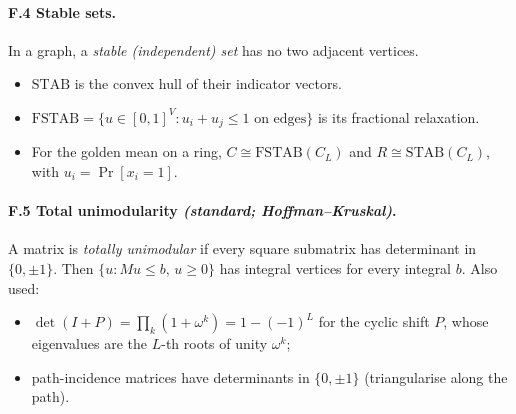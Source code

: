 \documentclass[11pt]{article}
\theoremstyle{definition}
\theoremstyle{remark}
\begin{document}
\paragraph{F.4 Stable sets.} In a graph, a \emph{stable (independent) set} has no
two adjacent vertices.
\begin{itemize}[nosep]
\item $\mathrm{STAB}$ is the convex hull of their indicator vectors.
\item $\mathrm{FSTAB}=\{u\in[0,1]^V: u_i+u_j\le1 \text{ on edges}\}$ is its
  fractional relaxation.
\item For the golden mean on a ring, $C\cong\mathrm{FSTAB}(C_L)$ and
  $R\cong\mathrm{STAB}(C_L)$, with $u_i=\Pr[x_i=1]$.
\end{itemize}

\paragraph{F.5 Total unimodularity \emph{(standard; Hoffman--Kruskal)}.} A matrix is
\emph{totally unimodular} if every square submatrix has determinant in
$\{0,\pm1\}$. Then $\{u: Mu\le b,\,u\ge0\}$ has integral vertices for every
integral $b$. Also used:
\begin{itemize}[nosep]
\item $\det(I+P)=\prod_k(1+\omega^k)=1-(-1)^L$ for the cyclic shift $P$, whose
  eigenvalues are the $L$-th roots of unity $\omega^k$;
\item path-incidence matrices have determinants in $\{0,\pm1\}$ (triangularise
  along the path).
\end{itemize}
\end{document}
